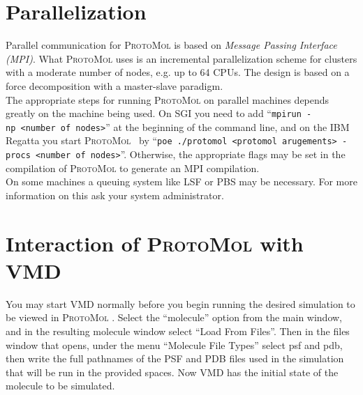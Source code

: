 \documentclass[11pt]{report}
\newcommand{\ProtoMol}{\textsc{ProtoMol }}
\providecommand{\ttsmall}[1]{\texttt{\small\mbox{#1}}}
\begin{document}

\chapter{Parallelization}

Parallel communication for \ProtoMol is based on {\it Message Passing
  Interface (MPI)}.  What \ProtoMol uses is an
incremental parallelization scheme for clusters with a moderate number
of nodes, e.g. up to 64 CPUs.  The design is based on a force
decomposition with a master-slave paradigm. \\

The appropriate steps for running \ProtoMol on parallel machines
depends greatly on the machine being used.  On SGI you need to add 
``\ttsmall{mpirun -np <number of nodes>}'' at the beginning
of the command line, and on the IBM Regatta you start \ProtoMol\ by
``\ttsmall{poe ./protomol <protomol arugements> -procs <number of nodes>}''. Otherwise, the
appropriate flags may be set in the compilation of \ProtoMol to
generate an MPI compilation. \\

On some machines a queuing system like LSF or PBS may be necessary.
For more information on this ask your system administrator.




\chapter{Interaction of \ProtoMol with VMD}

You may start VMD normally before you begin running the desired
simulation to be viewed in \ProtoMol.  Select the ``molecule'' option
from the main window, and in the resulting molecule window select
``Load From Files''.  Then in the files window that opens, under the
menu ``Molecule File Types'' select psf and pdb, then write the full
pathnames of the PSF and PDB files used in the simulation that will be
run in the provided spaces.  Now VMD has the initial state of the
molecule to be simulated. \\
\end{document}
